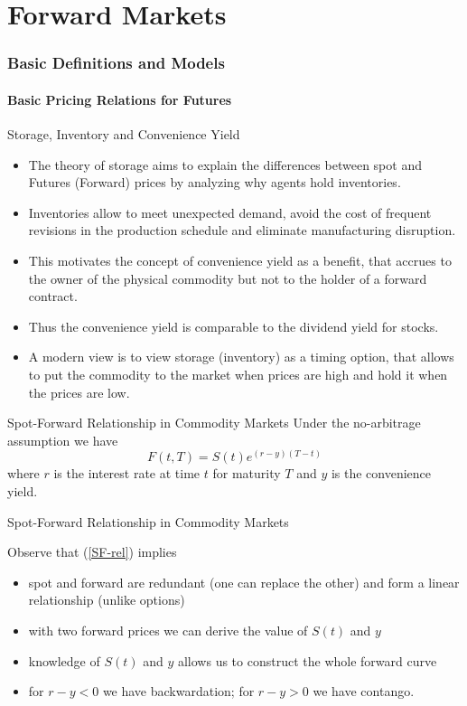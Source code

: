 \part{Forward Markets}
\section{Basic Definitions and Models}
\subsection{Basic Pricing Relations for Futures}

{Storage, Inventory and Convenience Yield}
\begin{itemize}
\item<1-> The theory of storage aims to explain the differences between spot
and Futures (Forward) prices by analyzing why agents hold inventories.
\item<2-> Inventories
allow to meet unexpected demand, avoid the cost of frequent revisions in
the production schedule and eliminate manufacturing disruption.
\item<3-> This
motivates the concept of convenience yield as a benefit, that accrues to the
owner of the physical commodity but not to the holder of a forward contract.
\item<4-> Thus the convenience yield is comparable to the dividend yield for stocks.
\item<5-> A modern view is to view storage (inventory) as a timing option, that
allows to put the commodity to the market when prices are high
and hold it when the prices are low.
\end{itemize}



{Spot-Forward Relationship in Commodity Markets }
Under the no-arbitrage assumption we have
\begin{equation}\label{SF-rel}
F(t,T)=S(t)e^{(r-y)(T-t)}
\end{equation}
where $r$ is the interest rate at time $t$ for maturity $T$ and $y$ is the convenience yield.





{Spot-Forward Relationship in Commodity Markets }


Observe that (\ref{SF-rel}) implies
\begin{itemize}
\item<1-> spot and forward are redundant (one can replace the other) and form a
linear relationship (unlike options)
\item<2-> with two forward prices we can derive the value of $S(t)$ and $y$
\item<3-> knowledge of $S(t)$ and $y$ allows us to construct the whole forward curve
\item<4-> for $r-y <0$ we have backwardation; for $r-y>0$ we have contango.
\end{itemize}




